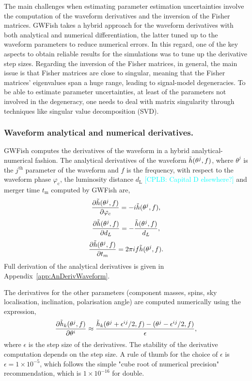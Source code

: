 \documentclass[a4paper,12pt]{article}
\newcommand{\cplb}[1]{\textcolor{cyan}{[CPLB: #1]}}
\begin{document}
The main challenges when estimating parameter estimation uncertainties involve the computation of the waveform derivatives and the inversion of the Fisher matrices. GWFish takes a hybrid approach for the waveform derivatives with both analytical and numerical differentiation, the latter tuned up to the waveform parameters to reduce numerical errors. 
In this regard, one of the key aspects to obtain reliable results for the simulations was to tune up the derivative step sizes. Regarding the inversion of the Fisher matrices, in general, the main issue is that Fisher matrices are close to singular, meaning that the Fisher matrices' eigenvalues span a huge range, leading to signal-model degeneracies. To be able to estimate parameter uncertainties, at least of the parameters not involved in the degeneracy, one needs to deal with matrix singularity through techniques like singular value decomposition (SVD). 

\subsubsection{Waveform analytical and numerical derivatives.}
\label{subsec:waveformannumderiv}

GWFish computes the derivatives of the waveform in a hybrid analytical-numerical fashion. The analytical derivatives of the waveform $\Tilde{h}(\theta^{j},f)$, where $\theta^{j}$ is the $j^{\mathrm{th}}$ parameter of the waveform and $f$ is the frequency, with respect to the waveform phase $\varphi_\mathrm{c}$, the luminosity distance $d_\mathrm{L}$ \cplb{Capital D elsewhere?} and merger time $t_\mathrm{m}$ computed by GWFish are,
\begin{equation}
\frac{\partial \Tilde{h}(\theta^{j},f)}{\partial \varphi_{c}} = -i \Tilde{h}(\theta^{j},f),
\label{phasederiv}
\end{equation}
\begin{equation}
\frac{\partial \Tilde{h}(\theta^{j},f)}{\partial d_{L}} = -\frac{\Tilde{h}(\theta^{j},f)}{d_{L}},
\label{lumdistderiv}
\end{equation}
\begin{equation}
\frac{\partial \Tilde{h}(\theta^{j},f)}{\partial t_{m}} = 2\pi i f \Tilde{h}(\theta^{j},f).
\label{timecderiv}
\end{equation}
Full derivation of the analytical derivatives is given in Appendix~\ref{app:AnDerivWaveform}.

The derivatives for the other parameters (component masses, spins, sky localisation, inclination, polarisation angle) are computed numerically using the expression,
\begin{equation}
\frac{\partial \Tilde{h}_{k}(\theta^{j},f)}{\partial \theta^{i}} \approx \frac{\Tilde{h}_{k}(\theta^{j} +\epsilon^{ij}/2,f) - (\theta^{j} -\epsilon^{ij}/2,f)}{\epsilon},
\label{numderiv}
\end{equation}
where $\epsilon$ is the step size of the derivatives. The stability of the derivative computation depends on the step size. A rule of thumb for the choice of $\epsilon$ is $\epsilon=1\times 10^{-5}$, which follows the simple "cube root of numerical precision" recommendation, which is $1\times 10^{-16}$ for double.
\end{document}
